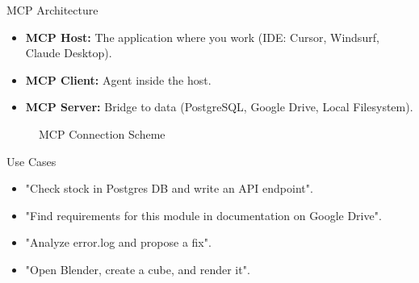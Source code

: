 \documentclass[aspectratio=169]{beamer}
\begin{document}
\begin{frame}[t]{MCP Architecture}
    \begin{itemize}
        \item \textbf{MCP Host:} The application where you work (IDE: Cursor, Windsurf, Claude Desktop).
        \item \textbf{MCP Client:} Agent inside the host.
        \item \textbf{MCP Server:} Bridge to data (PostgreSQL, Google Drive, Local Filesystem).
    \end{itemize}
        \begin{figure}
        \centering
        \caption{MCP Connection Scheme}
    \end{figure}
\end{frame}



\begin{frame}[t]{Use Cases}
    \begin{itemize}
        \item "Check stock in Postgres DB and write an API endpoint".
        \item "Find requirements for this module in documentation on Google Drive".
        \item "Analyze error.log and propose a fix".
        \item "Open Blender, create a cube, and render it".
    \end{itemize}
\end{frame}
\end{document}
